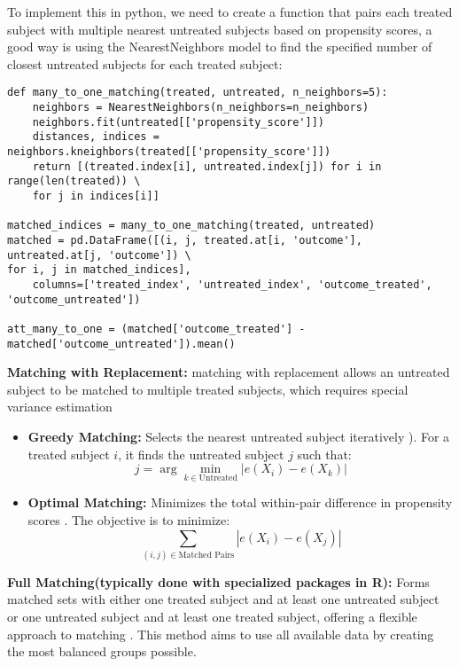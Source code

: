 \documentclass{article}
\begin{document}
\noindent To implement this in python, we need to create a function that pairs each treated subject with multiple nearest untreated subjects based on propensity scores, a good way is using the NearestNeighbors model to find the specified number of closest untreated subjects for each treated subject:
\begin{verbatim}
def many_to_one_matching(treated, untreated, n_neighbors=5):
    neighbors = NearestNeighbors(n_neighbors=n_neighbors)
    neighbors.fit(untreated[['propensity_score']])
    distances, indices = neighbors.kneighbors(treated[['propensity_score']])
    return [(treated.index[i], untreated.index[j]) for i in range(len(treated)) \
    for j in indices[i]]

matched_indices = many_to_one_matching(treated, untreated)
matched = pd.DataFrame([(i, j, treated.at[i, 'outcome'], untreated.at[j, 'outcome']) \ 
for i, j in matched_indices], 
    columns=['treated_index', 'untreated_index', 'outcome_treated', 'outcome_untreated'])
    
att_many_to_one = (matched['outcome_treated'] - matched['outcome_untreated']).mean()
\end{verbatim}

\textbf{Matching with Replacement:} matching with replacement allows an untreated subject to be matched to multiple treated subjects, which requires special variance estimation \cite{hill2006interval}

\begin{itemize}
    \item \textbf{Greedy Matching:} Selects the nearest untreated subject iteratively \cite{gu1993comparison}). For a treated subject \(i\), it finds the untreated subject \(j\) such that:
    \[
    j = \arg \min_{k \in \text{Untreated}} |e(X_i) - e(X_k)|
    \]
    \item \textbf{Optimal Matching:} Minimizes the total within-pair difference in propensity scores \cite{austin2011introduction}. The objective is to minimize:
    \[
    \sum_{(i,j) \in \text{Matched Pairs}} |e(X_i) - e(X_j)|
    \]
\end{itemize}

\textbf{Full Matching(typically done with specialized packages in R):}
Forms matched sets with either one treated subject and at least one untreated subject or one untreated subject and at least one treated subject, offering a flexible approach to matching \cite{austin2011introduction}. This method aims to use all available data by creating the most balanced groups possible.
\end{document}
